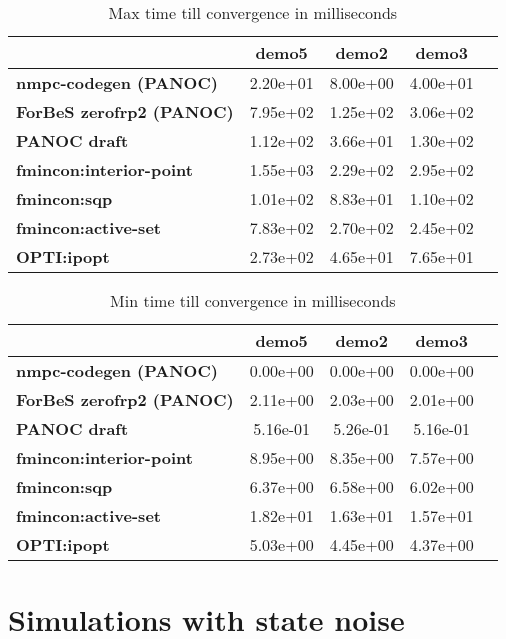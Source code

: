 \begin{table}[H]
	\centering
	\begin{tabular}{|l|c|c|c|c|}
		\hline
		&\textbf{demo5}&\textbf{demo2}&\textbf{demo3}\\\hline
		\textbf{nmpc-codegen (PANOC)}&2.20e+01&8.00e+00&4.00e+01\\\hline
		\textbf{ForBeS zerofrp2 (PANOC)}&7.95e+02&1.25e+02&3.06e+02\\\hline
		\textbf{PANOC draft}&1.12e+02&3.66e+01&1.30e+02\\\hline
		\textbf{fmincon:interior-point}&1.55e+03&2.29e+02&2.95e+02\\\hline
		\textbf{fmincon:sqp}&1.01e+02&8.83e+01&1.10e+02\\\hline
		\textbf{fmincon:active-set}&7.83e+02&2.70e+02&2.45e+02\\\hline
		\textbf{OPTI:ipopt}&2.73e+02&4.65e+01&7.65e+01\\\hline
	\end{tabular}
	\caption{Max time till convergence in milliseconds}
	\label{tbl:max time till convergence}
\end{table}

\begin{table}[H]
	\centering
	\begin{tabular}{|l|	c|c|c|c|}
		\hline
		&\textbf{demo5}&\textbf{demo2}&\textbf{demo3}\\\hline
		\textbf{nmpc-codegen (PANOC)}&0.00e+00&0.00e+00&0.00e+00\\\hline
		\textbf{ForBeS zerofrp2 (PANOC)}&2.11e+00&2.03e+00&2.01e+00\\\hline
		\textbf{PANOC draft}&5.16e-01&5.26e-01&5.16e-01\\\hline
		\textbf{fmincon:interior-point}&8.95e+00&8.35e+00&7.57e+00\\\hline
		\textbf{fmincon:sqp}&6.37e+00&6.58e+00&6.02e+00\\\hline
		\textbf{fmincon:active-set}&1.82e+01&1.63e+01&1.57e+01\\\hline
		\textbf{OPTI:ipopt}&5.03e+00&4.45e+00&4.37e+00\\\hline
	\end{tabular}
	\caption{Min time till convergence in milliseconds}
	\label{tbl:min time till convergence}
\end{table}


\section{Simulations with state noise}
\label{appendix:benchmarks trailer with noise}

